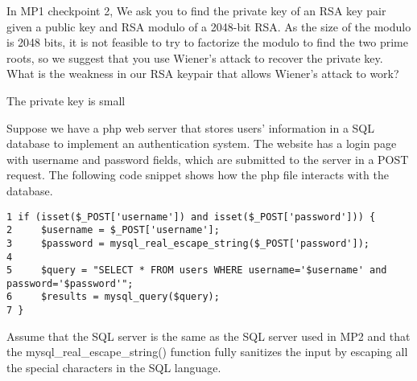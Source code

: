 \documentclass[addpoints,answers]{exam}
\begin{document}
\begin{questions}
\begin{parts}
In MP1 checkpoint 2, We ask you to find the private key of an RSA key pair given a public key and RSA modulo of a 2048-bit RSA.  As the size of the modulo is 2048 bits, it is not feasible to try to factorize the modulo to find the two prime roots, so we suggest that you use Wiener's attack to recover the private key.  What is the weakness in our RSA keypair that allows Wiener's attack to work?

\begin{solutionorbox}[1in]   
The private key is small
\end{solutionorbox}

\end{parts}

\pagebreak


Suppose we have a php web server that stores users' information in a
SQL database to implement an authentication system.  The website has a
login page with username and password fields, which are submitted to
the server in a POST request.  The following code snippet shows how
the php file interacts with the database.

\begin{lstlisting}
1 if (isset($_POST['username']) and isset($_POST['password'])) { 
2     $username = $_POST['username'];
3     $password = mysql_real_escape_string($_POST['password']);
4
5     $query = "SELECT * FROM users WHERE username='$username' and password='$password'";
6     $results = mysql_query($query);
7 }
\end{lstlisting}

Assume that the SQL server is the same as the SQL server used in MP2
and that the mysql\_real\_escape\_string() function fully sanitizes
the input by escaping all the special characters in the SQL language.

\end{questions}
\end{document}
